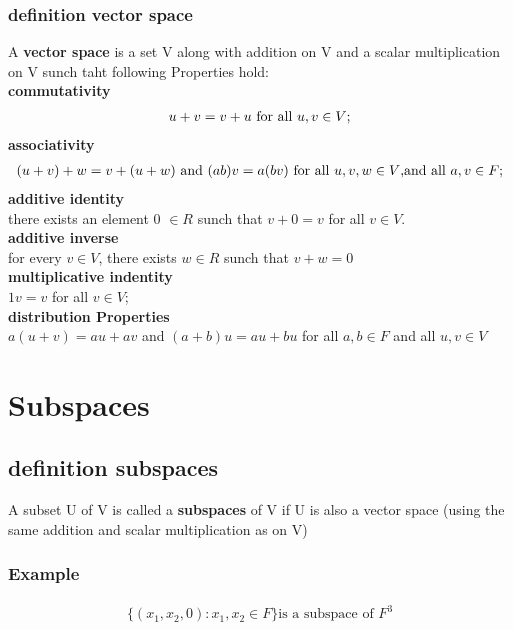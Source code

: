 \documentclass[a4paper,12pt]{article}
\begin{document}
    \subsubsection{definition vector space}
    A \textbf{vector space} is a set V along with addition on V and a scalar multiplication on V sunch taht following Properties hold: \\
    \textbf{commutativity}
    \begin{align*}
       \notag u + v = v + u \text{ for all } u,v \in V;
    \end{align*}
    \textbf{associativity}
    \begin{align*}
       \notag (u + v) + w = v + (u + w) \text{ and } (ab)v = a(bv) \text{ for all } u,v ,w \in V \text{,and all } a,v \in F;
    \end{align*}
    \textbf{additive identity} \\
    there exists an element 0 $\in R$ sunch that $v + 0 = v$ for all $v \in V$. \\
    \textbf{additive inverse} \\
    for every $v \in V$, there exists $w \in R$ sunch that $v + w = 0 $\\
    \textbf{multiplicative indentity}\\
    $1v = v$ for all $v \in V$; \\
    \textbf{distribution Properties} \\
    $a(u + v) = au + av$ and $(a + b)u = au + bu$ for all $a, b \in F$ and all $u, v \in V$

\section{\textbf{Subspaces}}
    \subsection{definition subspaces}
    A subset U of V is called a \textbf{subspaces} of V if U is also a vector space (using the same addition and scalar multiplication as on V) \\
        \subsubsection{Example}
            \begin{align*}
                \{(x_1, x_2, 0) : x_1, x_2 \in F\} \text{is a subspace of } F^3
            \end{align*}
\end{document}
